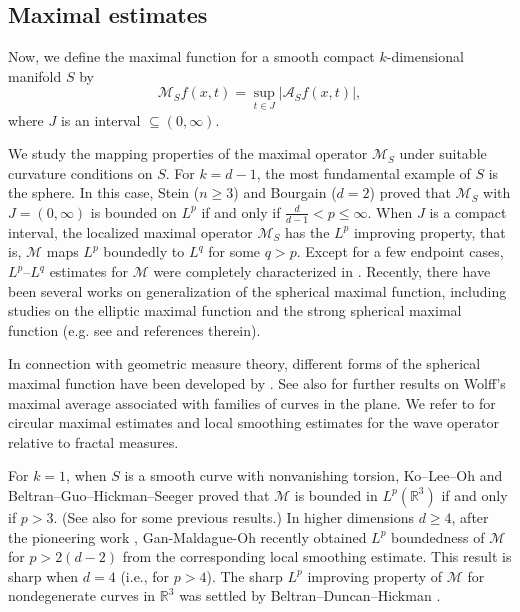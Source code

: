 \documentclass[10pt] %
{amsart}
\theoremstyle{plain}
\numberwithin{equation}{section}
\begin{document}
\bigskip
 

\subsection*{Maximal estimates}




Now, we define the maximal function for a smooth compact $k$-dimensional manifold $S$  by
\begin{equation*} 
\mathcal  M_S f (x, t )  = \sup_{t\in J}  \left| \mathcal A_S f(x,t)  \right|,
\end{equation*}
where  $J$ is an interval $\subseteq (0,\infty)$.   

We study the mapping properties of the maximal operator $\mathcal M_S$ under suitable curvature conditions on $S$.
For $k = d-1$, the most fundamental example of $S$ is the sphere. In this case, 
Stein \cite{St76} ($n\ge 3$) and Bourgain \cite{B} ($d=2$) proved that $\mathcal M_S$ with $J = (0,\infty)$ is bounded on $L^p$ 
if and only if $\frac d{d-1}< p \le \infty$.
When $J $ is a compact interval, the localized maximal operator $\mathcal M_S$ has the $L^p$ improving property, that is, $\mathcal M$ maps $L^p$ boundedly to $L^q$ for some $q > p$. 
Except for a few endpoint cases, $L^p$--$L^q$ estimates for $\mathcal M$ were completely characterized in \cite{Schlag, SS, Lee}. Recently, there have been several works on generalization of the spherical maximal function, including studies on the elliptic maximal function and the strong spherical maximal function (e.g. see \cite{LLO1, LLO2, CGY, HZ}  and references therein).

In connection with geometric measure theory, different forms of the spherical maximal function have been developed by \cite{Wo97, KW, Za12}.  
See also \cite{PYZ, Za23} for further results on 
Wolff's maximal average associated with families of curves in the plane.  
We refer to \cite{HKL2, CDK} for circular maximal estimates and local smoothing estimates for the wave operator relative to fractal measures. 


For $k=1$, when $S$ is a smooth curve with nonvanishing torsion, Ko--Lee--Oh \cite{KLO22} and Beltran--Guo--Hickman--Seeger \cite{BGHS} proved that 
$\mathcal M$ is bounded in $L^p(\mathbb R^3)$ if and only if $p>3$. (See also \cite{PS2, BD0} for some previous results.) 
In higher dimensions $d\ge4$, after the pioneering work  \cite{KLO23}, Gan-Maldague-Oh \cite{GMO} recently obtained $L^p$ boundedness of $\mathcal M$ for $p > 2(d-2)$ from the corresponding local smoothing estimate. This result is sharp when $d=4$ (i.e., for $p>4$). 
The sharp $L^p$ improving property of $\mathcal M$ for nondegenerate curves in $\mathbb R^3$ was settled by Beltran--Duncan--Hickman \cite{BDH}. 
\end{document}
